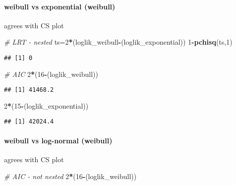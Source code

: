 \documentclass[]{article}
\newenvironment{Shaded}{\begin{snugshade}}{\end{snugshade}}
\newcommand{\CommentTok}[1]{\textcolor[rgb]{0.56,0.35,0.01}{\textit{#1}}}
\newcommand{\DecValTok}[1]{\textcolor[rgb]{0.00,0.00,0.81}{#1}}
\newcommand{\KeywordTok}[1]{\textcolor[rgb]{0.13,0.29,0.53}{\textbf{#1}}}
\newcommand{\NormalTok}[1]{#1}
\newcommand{\OperatorTok}[1]{\textcolor[rgb]{0.81,0.36,0.00}{\textbf{#1}}}
\let\oldparagraph\paragraph
\renewcommand{\paragraph}[1]{\oldparagraph{#1}\mbox{}}
\begin{document}
\hypertarget{weibull-vs-exponential-weibull}{%
\paragraph{weibull vs exponential
(weibull)}\label{weibull-vs-exponential-weibull}}

agrees with CS plot

\begin{Shaded}
\begin{Highlighting}[]
\CommentTok{# LRT - nested}
\NormalTok{ts=}\DecValTok{2}\OperatorTok{*}\NormalTok{(loglik_weibull}\OperatorTok{-}\NormalTok{(loglik_exponential))}
\DecValTok{1}\OperatorTok{-}\KeywordTok{pchisq}\NormalTok{(ts,}\DecValTok{1}\NormalTok{)}
\end{Highlighting}
\end{Shaded}

\begin{verbatim}
## [1] 0
\end{verbatim}

\begin{Shaded}
\begin{Highlighting}[]
\CommentTok{# AIC}
\DecValTok{2}\OperatorTok{*}\NormalTok{(}\DecValTok{16}\OperatorTok{-}\NormalTok{(loglik_weibull))}
\end{Highlighting}
\end{Shaded}

\begin{verbatim}
## [1] 41468.2
\end{verbatim}

\begin{Shaded}
\begin{Highlighting}[]
\DecValTok{2}\OperatorTok{*}\NormalTok{(}\DecValTok{15}\OperatorTok{-}\NormalTok{(loglik_exponential))}
\end{Highlighting}
\end{Shaded}

\begin{verbatim}
## [1] 42024.4
\end{verbatim}

\hypertarget{weibull-vs-log-normal-weibull}{%
\paragraph{weibull vs log-normal
(weibull)}\label{weibull-vs-log-normal-weibull}}

agrees with CS plot

\begin{Shaded}
\begin{Highlighting}[]
\CommentTok{# AIC - not nested }
\DecValTok{2}\OperatorTok{*}\NormalTok{(}\DecValTok{16}\OperatorTok{-}\NormalTok{(loglik_weibull))}
\end{Highlighting}
\end{Shaded}
\end{document}
